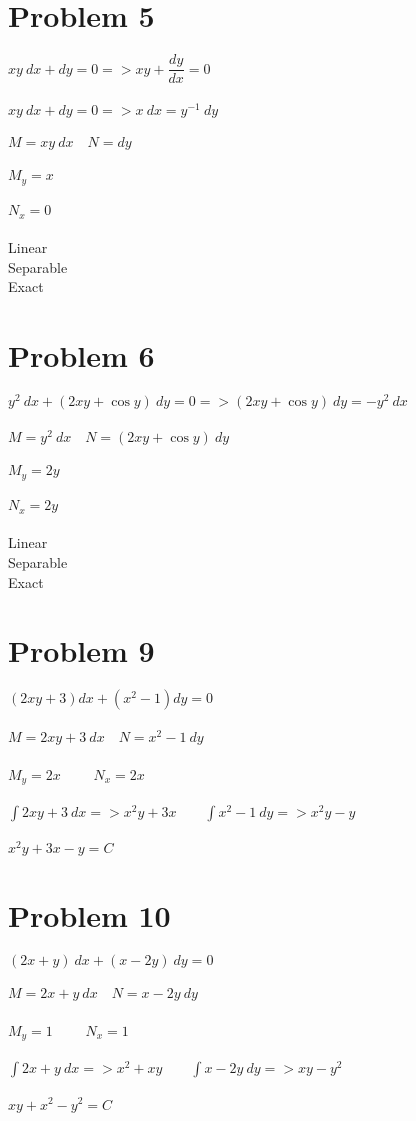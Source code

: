 \documentclass[12pt]{exam}
\begin{document}
\section*{Problem 5}
$xy\:dx+dy=0=>xy+\dfrac{dy}{dx}=0$\\\\
$xy\:dx+dy=0=>x\:dx=y^{-1}\:dy$\\\\
$M=xy\:dx\quad N=dy$\\\\
$M_y=x$\\\\
$N_x=0$\\\\
Linear \checkmark\\
Separable \checkmark\\
Exact
\section*{Problem 6}
$y^2\:dx+(2xy+\cos{y})\:dy=0=>(2xy+\cos{y})\:dy=-y^2\:dx$\\\\
$M=y^2\:dx\quad N=(2xy+\cos{y})\:dy$\\\\
$M_y=2y$\\\\
$N_x=2y$\\\\
Linear \checkmark\\
Separable\\
Exact \checkmark
\section*{Problem 9}
$(2xy+3)dx+(x^2-1)dy=0$\\\\
$M=2xy+3\:dx\quad N=x^2-1\:dy$\\\\
$M_y=2x\qquad$
$N_x=2x$\\\\
$\int2xy+3\:dx=>x^2y+3x\qquad\int x^2-1\:dy=>x^2y-y$\\\\
$x^2y+3x-y=C$
\section*{Problem 10}
$(2x+y)\:dx+(x-2y)\:dy=0$\\\\
$M=2x+y\:dx\quad N=x-2y\:dy$\\\\
$M_y=1\qquad$
$N_x=1$\\\\
$\int2x+y\:dx=>x^2+xy\qquad\int x-2y\:dy=>xy-y^2$\\\\
$xy+x^2-y^2=C$
\end{document}
